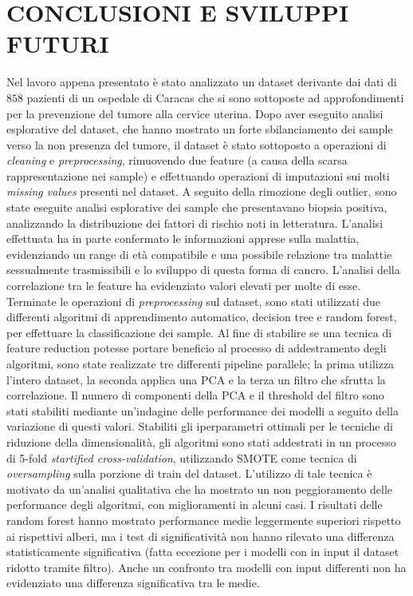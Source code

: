 \section{CONCLUSIONI E SVILUPPI FUTURI}
Nel lavoro appena presentato è stato analizzato un dataset derivante dai dati di $858$ pazienti di un ospedale di Caracas che si sono sottoposte ad approfondimenti per la prevenzione del tumore alla cervice uterina.
Dopo aver eseguito analisi esplorative del dataset, che hanno mostrato un forte sbilanciamento dei sample verso la non presenza del tumore, il dataset è stato sottoposto a operazioni di \textit{cleaning} e \textit{preprocessing}, rimuovendo due feature (a causa della scarsa rappresentazione nei sample) e effettuando operazioni di imputazioni sui molti \textit{missing values} presenti nel dataset.
A seguito della rimozione degli outlier, sono state eseguite analisi esplorative dei sample che presentavano biopsia positiva, analizzando la distribuzione dei fattori di rischio noti in letteratura.
L'analisi effettuata ha in parte confermato le informazioni apprese sulla malattia, evidenziando un range di età compatibile e una possibile relazione tra malattie sessualmente trasmissibili e lo sviluppo di questa forma di cancro.
L'analisi della correlazione tra le feature ha evidenziato valori elevati per molte di esse.\\
Terminate le operazioni di \textit{preprocessing} sul dataset, sono stati utilizzati due differenti algoritmi di apprendimento automatico, decision tree e random forest, per effettuare la classificazione dei sample.
Al fine di stabilire se una tecnica di feature reduction potesse portare beneficio al processo di addestramento degli algoritmi, sono state realizzate tre differenti pipeline parallele; la prima utilizza l'intero dataset, la seconda applica una PCA e la terza un filtro che sfrutta la correlazione.
Il numero di componenti della PCA e il threshold del filtro sono stati stabiliti mediante un'indagine delle performance dei modelli a seguito della variazione di questi valori.
Stabiliti gli iperparametri ottimali per le tecniche di riduzione della dimensionalità, gli algoritmi sono stati addestrati in un processo di 5-fold \textit{startified cross-validation}, utilizzando SMOTE come tecnica di \textit{oversampling} sulla porzione di train del dataset.
L'utilizzo di tale tecnica è motivato da un'analisi qualitativa che ha mostrato un non peggioramento delle performance degli algoritmi, con miglioramenti in alcuni casi.
I risultati delle random forest hanno mostrato performance medie leggermente superiori rispetto ai rispettivi alberi, ma i test di significatività non hanno rilevato una differenza statisticamente significativa (fatta eccezione per i modelli con in input il dataset ridotto tramite filtro). Anche un confronto tra modelli con input differenti non ha evidenziato una differenza significativa tra le medie.
